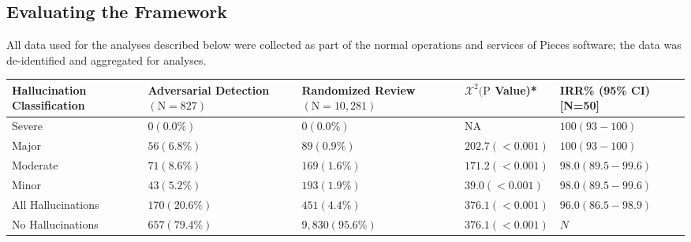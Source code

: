 \documentclass{style/myclass}
\begin{document}
\subsection{Evaluating the Framework}

All data used for the analyses described below were collected as part of the normal operations and services of Pieces software; the data was de-identified and aggregated for analyses.

\begin{table}
\centering
\begin{adjustbox}{max width=\textwidth}
\begin{tabular}{|C{3cm}|C{3.5cm}|C{3cm}|C{3cm}|C{4cm}|}
\hline 
{}
{\color{bg}\textbf{Hallucination Classification}} &  {\color{bg}\textbf{Adversarial Detection $(\mathrm{N}=827)$}} & {\color{bg}\textbf{Randomized Review $(\mathrm{N}=10,281)$}}  & {\color{bg}\textbf{$\mathcal{X}^2(\mathrm{P}$ Value)*}} & {\color{bg}\textbf{IRR\% (95\% CI) [N=50]}} \\ \hline 
Severe & $0(0.0 \%)$ & $0(0.0 \%)$ & NA & $100(93-100)$ \\ \hline 
{}
Major & $56(6.8 \%)$ & $89(0.9 \%)$ & $202.7(<0.001)$ & $100(93-100)$ \\ \hline 
Moderate & $71(8.6 \%)$ & $169(1.6 \%)$ & $171.2(<0.001)$ & $98.0(89.5-99.6)$ \\ \hline 
{}
Minor & $43(5.2 \%)$ & $193(1.9 \%)$ & $39.0(<0.001)$ & $98.0(89.5-99.6)$ \\ \hline 
All Hallucinations & $170(20.6 \%)$ & $451(4.4 \%)$ & $376.1(<0.001)$ & $96.0(86.5-98.9)$ \\ \hline 
{}
No Hallucinations & $657(79.4 \%)$ & $9,830(95.6 \%)$ & $376.1(<0.001)$ & $N$ \\ \hline
\end{tabular}
\end{adjustbox}

\end{table}
\end{document}
